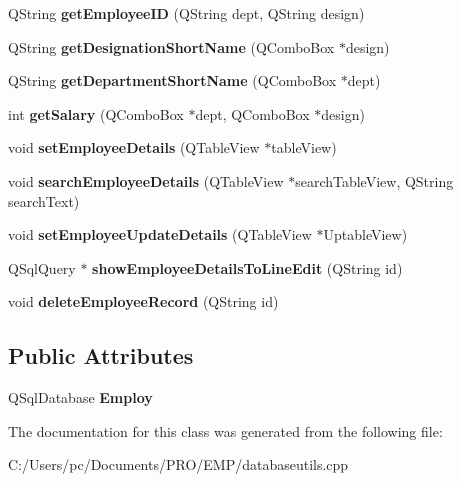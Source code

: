 \begin{DoxyCompactItemize}
Q\+String {\bfseries get\+Employee\+ID} (Q\+String dept, Q\+String design)
\item 
\mbox{\label{class_database_utils_a15dcd61a4107961488094c8a246cbc5b}} 
Q\+String {\bfseries get\+Designation\+Short\+Name} (Q\+Combo\+Box $\ast$design)
\item 
\mbox{\label{class_database_utils_ae08de62e98e95d1c8b6048f8b10d2c59}} 
Q\+String {\bfseries get\+Department\+Short\+Name} (Q\+Combo\+Box $\ast$dept)
\item 
\mbox{\label{class_database_utils_ab01e50334cecf44a98cd9922d767f827}} 
int {\bfseries get\+Salary} (Q\+Combo\+Box $\ast$dept, Q\+Combo\+Box $\ast$design)
\item 
\mbox{\label{class_database_utils_af73399487169930655b66123eeb65637}} 
void {\bfseries set\+Employee\+Details} (Q\+Table\+View $\ast$table\+View)
\item 
\mbox{\label{class_database_utils_aa2f3224d0bb331a5f7bed470ffcef6dd}} 
void {\bfseries search\+Employee\+Details} (Q\+Table\+View $\ast$search\+Table\+View, Q\+String search\+Text)
\item 
\mbox{\label{class_database_utils_a915e1d43584500e2519f67265b0d792f}} 
void {\bfseries set\+Employee\+Update\+Details} (Q\+Table\+View $\ast$Uptable\+View)
\item 
\mbox{\label{class_database_utils_a9ef5766e143076e2334495282706b9c3}} 
Q\+Sql\+Query $\ast$ {\bfseries show\+Employee\+Details\+To\+Line\+Edit} (Q\+String id)
\item 
\mbox{\label{class_database_utils_a15083ce47b8e821f13e6884c8bb3666c}} 
void {\bfseries delete\+Employee\+Record} (Q\+String id)
\end{DoxyCompactItemize}
\subsection*{Public Attributes}
\begin{DoxyCompactItemize}
\item 
\mbox{\label{class_database_utils_ad6b57582f89ccd499b7653f2f1912654}} 
Q\+Sql\+Database {\bfseries Employ}
\end{DoxyCompactItemize}


The documentation for this class was generated from the following file\+:\begin{DoxyCompactItemize}
\item 
C\+:/\+Users/pc/\+Documents/\+P\+R\+O/\+E\+M\+P/databaseutils.\+cpp\end{DoxyCompactItemize}
